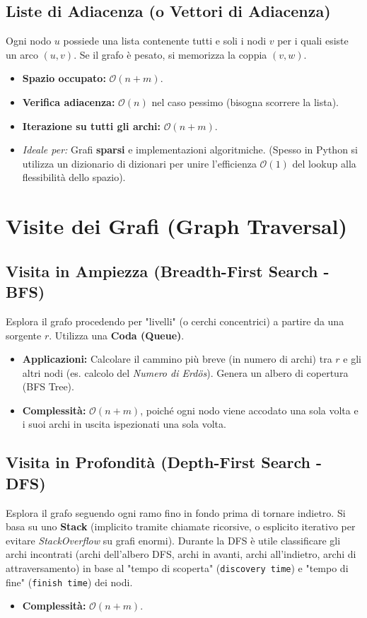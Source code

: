 \documentclass[12pt, a4paper]{article}
\begin{document}
\subsection{Liste di Adiacenza (o Vettori di Adiacenza)}
Ogni nodo $u$ possiede una lista contenente tutti e soli i nodi $v$ per i quali esiste un arco $(u, v)$. Se il grafo è pesato, si memorizza la coppia $(v, w)$.
\begin{itemize}
\item \textbf{Spazio occupato:} $\mathcal{O}(n + m)$.
\item \textbf{Verifica adiacenza:} $\mathcal{O}(n)$ nel caso pessimo (bisogna scorrere la lista).
\item \textbf{Iterazione su tutti gli archi:} $\mathcal{O}(n + m)$.
\item \textit{Ideale per:} Grafi \textbf{sparsi} e implementazioni algoritmiche. (Spesso in Python si utilizza un dizionario di dizionari per unire l'efficienza $\mathcal{O}(1)$ del lookup alla flessibilità dello spazio).
\end{itemize}

\newpage

\section{Visite dei Grafi (Graph Traversal)}

\subsection{Visita in Ampiezza (Breadth-First Search - BFS)}
Esplora il grafo procedendo per "livelli" (o cerchi concentrici) a partire da una sorgente $r$. Utilizza una \textbf{Coda (Queue)}.
\begin{itemize}
\item \textbf{Applicazioni:} Calcolare il cammino più breve (in numero di archi) tra $r$ e gli altri nodi (es. calcolo del \textit{Numero di Erdös}). Genera un albero di copertura (BFS Tree).
\item \textbf{Complessità:} $\mathcal{O}(n + m)$, poiché ogni nodo viene accodato una sola volta e i suoi archi in uscita ispezionati una sola volta.
\end{itemize}

\subsection{Visita in Profondità (Depth-First Search - DFS)}
Esplora il grafo seguendo ogni ramo fino in fondo prima di tornare indietro. Si basa su uno \textbf{Stack} (implicito tramite chiamate ricorsive, o esplicito iterativo per evitare \textit{StackOverflow} su grafi enormi).
Durante la DFS è utile classificare gli archi incontrati (archi dell'albero DFS, archi in avanti, archi all'indietro, archi di attraversamento) in base al "tempo di scoperta" (\texttt{discovery time}) e "tempo di fine" (\texttt{finish time}) dei nodi.
\begin{itemize}
\item \textbf{Complessità:} $\mathcal{O}(n + m)$.
\end{itemize}
\end{document}
